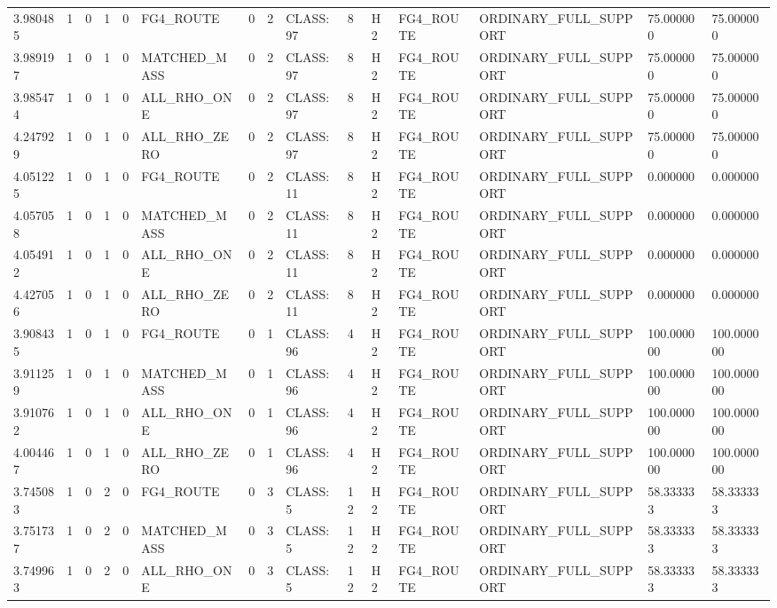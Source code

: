 \begin{tabular}{lllllllllllllll}
3.980485 & 1 & 0 & 1 & 0 & FG4\_ROUTE & 0 & 2 & CLASS:97 & 8 & H2 & FG4\_ROUTE & ORDINARY\_FULL\_SUPPORT & 75.000000 & 75.000000 \\
3.989197 & 1 & 0 & 1 & 0 & MATCHED\_MASS & 0 & 2 & CLASS:97 & 8 & H2 & FG4\_ROUTE & ORDINARY\_FULL\_SUPPORT & 75.000000 & 75.000000 \\
3.985474 & 1 & 0 & 1 & 0 & ALL\_RHO\_ONE & 0 & 2 & CLASS:97 & 8 & H2 & FG4\_ROUTE & ORDINARY\_FULL\_SUPPORT & 75.000000 & 75.000000 \\
4.247929 & 1 & 0 & 1 & 0 & ALL\_RHO\_ZERO & 0 & 2 & CLASS:97 & 8 & H2 & FG4\_ROUTE & ORDINARY\_FULL\_SUPPORT & 75.000000 & 75.000000 \\
4.051225 & 1 & 0 & 1 & 0 & FG4\_ROUTE & 0 & 2 & CLASS:11 & 8 & H2 & FG4\_ROUTE & ORDINARY\_FULL\_SUPPORT & 0.000000 & 0.000000 \\
4.057058 & 1 & 0 & 1 & 0 & MATCHED\_MASS & 0 & 2 & CLASS:11 & 8 & H2 & FG4\_ROUTE & ORDINARY\_FULL\_SUPPORT & 0.000000 & 0.000000 \\
4.054912 & 1 & 0 & 1 & 0 & ALL\_RHO\_ONE & 0 & 2 & CLASS:11 & 8 & H2 & FG4\_ROUTE & ORDINARY\_FULL\_SUPPORT & 0.000000 & 0.000000 \\
4.427056 & 1 & 0 & 1 & 0 & ALL\_RHO\_ZERO & 0 & 2 & CLASS:11 & 8 & H2 & FG4\_ROUTE & ORDINARY\_FULL\_SUPPORT & 0.000000 & 0.000000 \\
3.908435 & 1 & 0 & 1 & 0 & FG4\_ROUTE & 0 & 1 & CLASS:96 & 4 & H2 & FG4\_ROUTE & ORDINARY\_FULL\_SUPPORT & 100.000000 & 100.000000 \\
3.911259 & 1 & 0 & 1 & 0 & MATCHED\_MASS & 0 & 1 & CLASS:96 & 4 & H2 & FG4\_ROUTE & ORDINARY\_FULL\_SUPPORT & 100.000000 & 100.000000 \\
3.910762 & 1 & 0 & 1 & 0 & ALL\_RHO\_ONE & 0 & 1 & CLASS:96 & 4 & H2 & FG4\_ROUTE & ORDINARY\_FULL\_SUPPORT & 100.000000 & 100.000000 \\
4.004467 & 1 & 0 & 1 & 0 & ALL\_RHO\_ZERO & 0 & 1 & CLASS:96 & 4 & H2 & FG4\_ROUTE & ORDINARY\_FULL\_SUPPORT & 100.000000 & 100.000000 \\
3.745083 & 1 & 0 & 2 & 0 & FG4\_ROUTE & 0 & 3 & CLASS:5 & 12 & H2 & FG4\_ROUTE & ORDINARY\_FULL\_SUPPORT & 58.333333 & 58.333333 \\
3.751737 & 1 & 0 & 2 & 0 & MATCHED\_MASS & 0 & 3 & CLASS:5 & 12 & H2 & FG4\_ROUTE & ORDINARY\_FULL\_SUPPORT & 58.333333 & 58.333333 \\
3.749963 & 1 & 0 & 2 & 0 & ALL\_RHO\_ONE & 0 & 3 & CLASS:5 & 12 & H2 & FG4\_ROUTE & ORDINARY\_FULL\_SUPPORT & 58.333333 & 58.333333 \\

\end{tabular}
